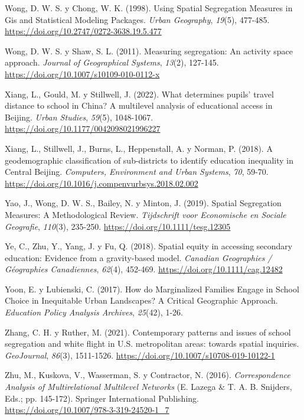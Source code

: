 \documentclass[
  spanish,
  a4paper,%
  chapterprefix=true,%
  DIV=calc,%
  twoside]{scrbook}%
\newlength{\cslhangindent}
\newenvironment{CSLReferences}[2] %
 {\begin{list}{}{%
  \setlength{\itemindent}{0pt}
  \setlength{\leftmargin}{0pt}
  \setlength{\parsep}{0pt}
  \ifodd #1
   \setlength{\leftmargin}{\cslhangindent}
   \setlength{\itemindent}{-1\cslhangindent}
  \fi
  \setlength{\itemsep}{#2\baselineskip}}}
 {\end{list}}
\begin{document}
\begin{CSLReferences}{1}{0}
Wong, D. W. S. y Chong, W. K. (1998). Using Spatial Segregation Measures in Gis and Statistical Modeling Packages. \emph{Urban Geography}, \emph{19}(5), 477-485. \url{https://doi.org/10.2747/0272-3638.19.5.477}

Wong, D. W. S. y Shaw, S. L. (2011). Measuring segregation: An activity space approach. \emph{Journal of Geographical Systems}, \emph{13}(2), 127-145. \url{https://doi.org/10.1007/s10109-010-0112-x}

Xiang, L., Gould, M. y Stillwell, J. (2022). What determines pupils{'} travel distance to school in China? A multilevel analysis of educational access in Beijing. \emph{Urban Studies}, \emph{59}(5), 1048-1067. \url{https://doi.org/10.1177/0042098021996227}

Xiang, L., Stillwell, J., Burns, L., Heppenstall, A. y Norman, P. (2018). A geodemographic classification of sub-districts to identify education inequality in Central Beijing. \emph{Computers, Environment and Urban Systems}, \emph{70}, 59-70. \url{https://doi.org/10.1016/j.compenvurbsys.2018.02.002}

Yao, J., Wong, D. W. S., Bailey, N. y Minton, J. (2019). Spatial Segregation Measures: A Methodological Review. \emph{Tijdschrift voor Economische en Sociale Geografie}, \emph{110}(3), 235-250. \url{https://doi.org/10.1111/tesg.12305}

Ye, C., Zhu, Y., Yang, J. y Fu, Q. (2018). Spatial equity in accessing secondary education: Evidence from a gravity{-}based model. \emph{Canadian Geographies / Géographies Canadiennes}, \emph{62}(4), 452-469. \url{https://doi.org/10.1111/cag.12482}

Yoon, E. y Lubienski, C. (2017). How do Marginalized Families Engage in School Choice in Inequitable Urban Landscapes? A Critical Geographic Approach. \emph{Education Policy Analysis Archives}, \emph{25}(42), 1-26.

Zhang, C. H. y Ruther, M. (2021). Contemporary patterns and issues of school segregation and white flight in U.S. metropolitan areas: towards spatial inquiries. \emph{GeoJournal}, \emph{86}(3), 1511-1526. \url{https://doi.org/10.1007/s10708-019-10122-1}

Zhu, M., Kuskova, V., Wasserman, S. y Contractor, N. (2016). \emph{Correspondence Analysis of Multirelational Multilevel Networks} (E. Lazega \& T. A. B. Snijders, Eds.; pp. 145-172). Springer International Publishing. \url{https://doi.org/10.1007/978-3-319-24520-1_7}


\end{CSLReferences}
\end{document}
